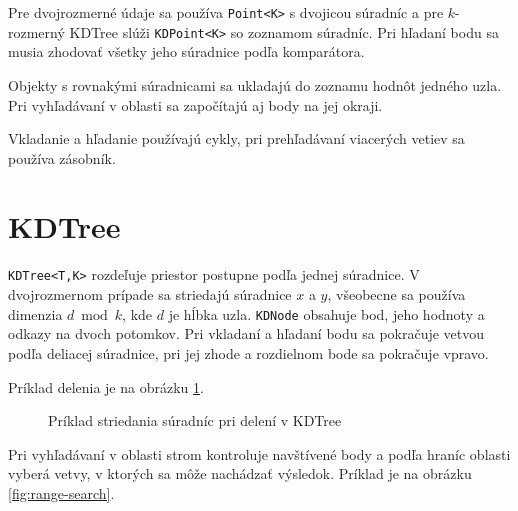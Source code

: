 \documentclass[12pt,a4paper,oneside]{report}
\begin{document}
Pre dvojrozmerné údaje sa používa \texttt{Point<K>} s dvojicou
súradníc a pre \(k\)-rozmerný KDTree slúži \texttt{KDPoint<K>} so
zoznamom súradníc. Pri hľadaní bodu sa musia zhodovať všetky jeho
súradnice podľa komparátora.

Objekty s rovnakými súradnicami sa ukladajú do zoznamu hodnôt jedného
uzla. Pri vyhľadávaní v oblasti sa započítajú aj body na jej okraji.

Vkladanie a hľadanie používajú cykly, pri prehľadávaní viacerých vetiev
sa používa zásobník.

\section{KDTree}
\texttt{KDTree<T,K>} rozdeľuje priestor postupne podľa jednej súradnice.
V dvojrozmernom prípade sa striedajú súradnice \(x\) a \(y\), všeobecne
sa používa dimenzia \(d \bmod k\), kde \(d\) je hĺbka uzla.
\texttt{KDNode} obsahuje bod, jeho hodnoty a odkazy na dvoch potomkov.
Pri vkladaní a hľadaní bodu sa pokračuje vetvou podľa deliacej súradnice,
pri jej zhode a rozdielnom bode sa pokračuje vpravo.

Príklad delenia je na obrázku \ref{fig:kd-partition}.

\begin{figure}[H]
\centering
{}
\caption{Príklad striedania súradníc pri delení v KDTree}
\label{fig:kd-partition}
\end{figure}

Pri vyhľadávaní v oblasti strom kontroluje navštívené body a podľa
hraníc oblasti vyberá vetvy, v ktorých sa môže nachádzať výsledok.
Príklad je na obrázku \ref{fig:range-search}.
\end{document}

